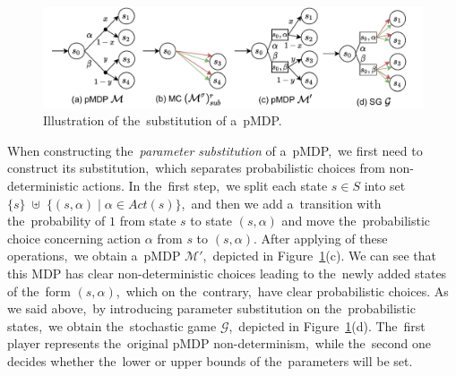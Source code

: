 \begin{figure}[h!]
\centering
\includegraphics[width=1.0\textwidth]{figures/mdp_sub.pdf}
\caption{Illustration of the~substitution of a~pMDP.}%
\label{fig:sub_mdp}%
\end{figure}
\noindent
When constructing the~\textit{parameter substitution} of a~pMDP,~we first need to construct its substitution,~which separates probabilistic choices from non-deterministic actions.
In the~first step,~we split each state $s \in S$ into set $\{s \} \; \uplus \; \{ (s, \alpha) \; \lvert \; \alpha \in Act(s) \}$,~and then we add a~transition with the~probability of $1$ from state $s$ to state $(s, \alpha)$ and move the~probabilistic choice concerning action $\alpha$ from $s$ to $(s, \alpha)$.
After applying of these operations,~we obtain a~pMDP $\mathcal{M}'$,~depicted in Figure~\ref{fig:sub_mdp}(c).
We can see that this MDP has clear non-deterministic choices leading to the~newly added states of the~form $(s, \alpha)$,~which on the~contrary,~have clear probabilistic choices.
As we said above,~by introducing parameter substitution on the~probabilistic states,~we obtain the~stochastic game $\mathcal{G}$,~depicted in Figure~\ref{fig:sub_mdp}(d).
The~first player represents the~original pMDP non-determinism,~while the~second one decides whether the~lower or upper bounds of the~parameters will be set.

